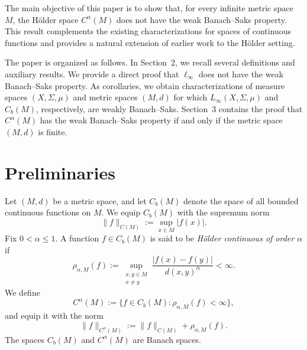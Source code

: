 \documentclass[11pt, reqno]{amsart}
\begin{document}
The main objective of this paper is to show that, for every infinite metric space $M$, the H\"older space $C^{\alpha}(M)$ does not have the weak Banach--Saks property. This result complements the existing characterizations for spaces of continuous functions and provides a natural extension of earlier work to the H\"older setting.

The paper is organized as follows. In Section~2, we recall several definitions and auxiliary results. We provide a direct proof that $\ell_\infty$ does not have the weak Banach--Saks property. As corollaries, we obtain characterizations of measure spaces $(X,\Sigma,\mu)$ and metric spaces $(M,d)$ for which $L_\infty(X,\Sigma,\mu)$ and $C_b(M)$, respectively, are weakly Banach--Saks. Section~3 contains the proof that $C^{\alpha}(M)$ has the weak Banach--Saks property if and only if the metric space $(M,d)$ is finite.



\section{Preliminaries}
Let $(M,d)$ be a metric space, and let $C_b(M)$ denote the space of all bounded continuous functions on $M$. We equip $C_b(M)$ with the supremum norm
\[
\|f\|_{C(M)} := \sup_{x \in M} |f(x)|.
\]
Fix $0 < \alpha \le 1$. A function $f \in C_b(M)$ is said to be \emph{Hölder continuous of order $\alpha$} if
\[
\rho_{\alpha, M}(f) := \sup_{\substack{x,y \in M \\ x \neq y}} 
\frac{|f(x) - f(y)|}{d(x,y)^\alpha} < \infty.
\]
We define
\[
C^\alpha(M) := \{ f \in C_b(M) : \rho_{\alpha, M}(f) < \infty \},
\]
and equip it with the norm
\[
\|f\|_{C^\alpha (M)} := \|f\|_{C(M)} + \rho_{\alpha, M}(f).
\]
The spaces $C_b(M)$ and $C^\alpha(M)$ are Banach spaces. 
\end{document}
